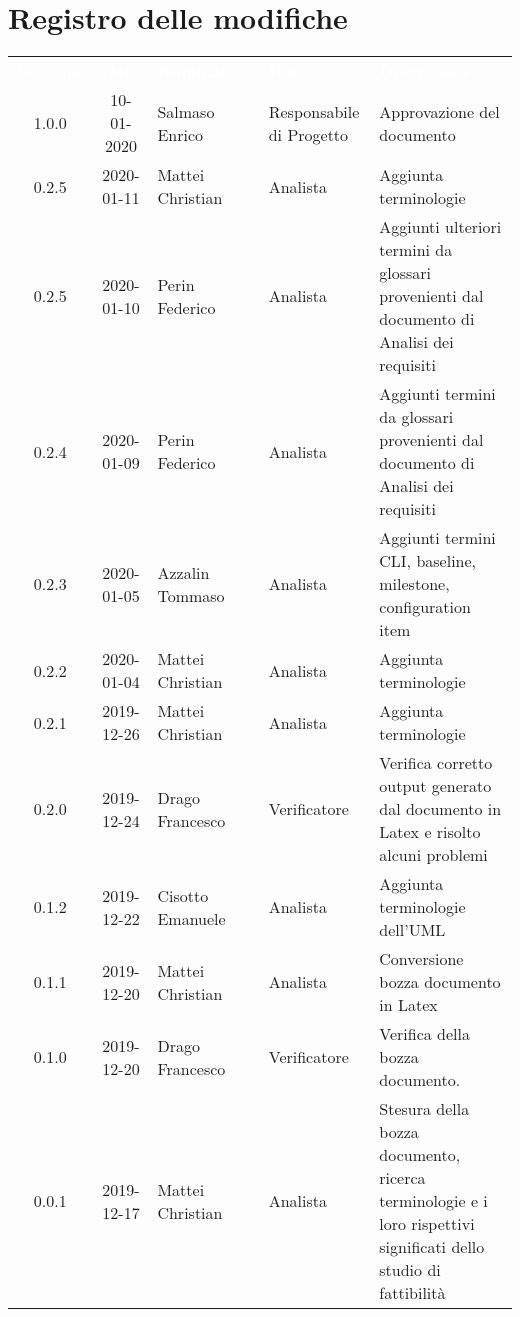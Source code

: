\section*{Registro delle modifiche}
{
\renewcommand{\arraystretch}{1.5}
\centering
\begin{longtable}{ c c  C{4cm}  C{3cm} C{4cm}}
\textcolor{white}{\textbf{Versione}} & \textcolor{white}{\textbf{Data}} & \textcolor{white}{\textbf{Nominativo}} & \textcolor{white}{\textbf{Ruolo}} & \textcolor{white}{\textbf{Descrizione}}\\	


1.0.0 & 10-01-2020 & Salmaso Enrico & Responsabile di Progetto & Approvazione del documento \\

0.2.5 & 2020-01-11 & Mattei Christian & Analista & Aggiunta terminologie \\

0.2.5 & 2020-01-10 & Perin Federico & Analista & Aggiunti ulteriori termini da glossari provenienti dal documento di Analisi dei requisiti \\

0.2.4 & 2020-01-09 & Perin Federico & Analista & Aggiunti termini da glossari provenienti dal documento di Analisi dei requisiti \\

0.2.3 & 2020-01-05 & Azzalin Tommaso & Analista & Aggiunti termini CLI, baseline, milestone, configuration item \\

0.2.2 & 2020-01-04 & Mattei Christian & Analista & Aggiunta terminologie \\

0.2.1 & 2019-12-26 & Mattei Christian & Analista & Aggiunta terminologie \\

0.2.0 & 2019-12-24 & Drago Francesco & Verificatore & Verifica corretto output generato dal documento in Latex e risolto alcuni problemi\\

0.1.2 & 2019-12-22 & Cisotto Emanuele & Analista & Aggiunta terminologie dell'UML \\

0.1.1 & 2019-12-20 & Mattei Christian & Analista & Conversione bozza documento in Latex\\
		
0.1.0 & 2019-12-20 & Drago Francesco & Verificatore & Verifica della bozza documento.  \\
		
0.0.1 & 2019-12-17 & Mattei Christian & Analista & Stesura della bozza documento, ricerca terminologie e i loro rispettivi significati dello studio di fattibilità \\
		
\end{longtable}
}